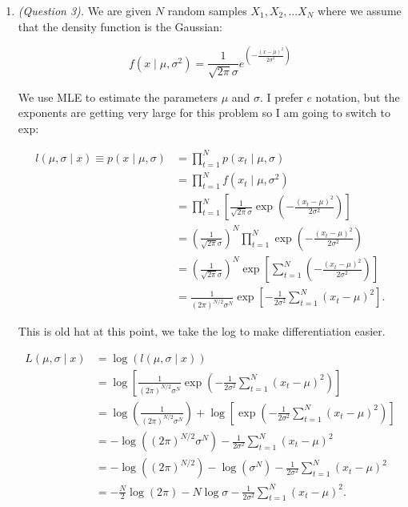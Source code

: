 \documentclass[12pt]{article}
\begin{document}
\begin{enumerate}
\item \emph{(Question 3).} We are given $N$ random samples $X_1, X_2, ... X_N$ where we assume that the density function is the Gaussian:

$$ f(x \mid \mu , \sigma^2) = \frac{1}{\sqrt{2\pi}\sigma}e^{\displaystyle \left(-\frac{(x-\mu)^2}{2\sigma^2}\right)}$$

We use MLE to estimate the parameters $\mu$ and $\sigma$. I prefer $e$ notation, but the exponents are getting very large for this problem so I am going to switch to exp:

\[
\begin{aligned}
l(\mu, \sigma \mid x) \equiv p(x \mid \mu, \sigma)
&= \prod_{t=1}^N p(x_t \mid \mu, \sigma) \\
&= \prod_{t=1}^N f(x_t \mid \mu, \sigma^2) \\
&= \prod_{t=1}^N \left[\frac{1}{\sqrt{2\pi}\sigma}
   \exp\left(-\frac{(x_t-\mu)^2}{2\sigma^2}\right)\right] \\
&= \left(\frac{1}{\sqrt{2\pi}\sigma}\right)^N
   \prod_{t=1}^N \exp\left(-\frac{(x_t-\mu)^2}{2\sigma^2}\right) \\
&= \left(\frac{1}{\sqrt{2\pi}\sigma}\right)^N
   \exp\left[\sum_{t=1}^N \left(-\frac{(x_t-\mu)^2}{2\sigma^2}\right)\right] \\
&= \frac{1}{(2\pi)^{N/2}\sigma^N}
   \exp\left[-\frac{1}{2\sigma^2}\sum_{t=1}^N (x_t-\mu)^2\right].
\end{aligned}
\] 

This is old hat at this point, we take the log to make differentiation easier. 

\[
\begin{aligned}
L(\mu, \sigma \mid x)
&= \log\left(l(\mu, \sigma \mid x)\right) \\
&= \log\left[\frac{1}{(2\pi)^{N/2}\sigma^N}
   \exp\left(-\frac{1}{2\sigma^2}\sum_{t=1}^N (x_t-\mu)^2\right)\right] \\
&= \log\left(\frac{1}{(2\pi)^{N/2}\sigma^N}\right)
   + \log\left[\exp\left(-\frac{1}{2\sigma^2}\sum_{t=1}^N (x_t-\mu)^2\right)\right] \\
&= -\log\left((2\pi)^{N/2}\sigma^N\right)
   - \frac{1}{2\sigma^2}\sum_{t=1}^N (x_t-\mu)^2 \\
&= -\log\left((2\pi)^{N/2}\right) - \log\left(\sigma^N\right)
   - \frac{1}{2\sigma^2}\sum_{t=1}^N (x_t-\mu)^2 \\
&= -\frac{N}{2}\log(2\pi) - N\log\sigma
   - \frac{1}{2\sigma^2}\sum_{t=1}^N (x_t-\mu)^2.
\end{aligned}
\] 


\end{enumerate}
\end{document}
